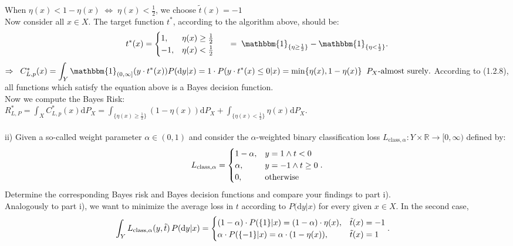 \documentclass{article}
\begin{document}
When $\eta(x) < 1-\eta(x) \;\Leftrightarrow\; \eta(x) < \frac{1}{2}$, we choose $\tilde{t}(x) = -1$\\
Now consider all $x\in X$. The target function $t^*$, according to the algorithm above, should be:
\begin{align*}
t^*(x) = \begin{cases} 1, &\eta(x) \geq \frac{1}{2} \cr -1, &\eta(x) < \frac{1}{2} \end{cases} 
\indent = \; \mathbbm{1}_{\{\eta \geq \frac{1}{2}\}} - \mathbbm{1}_{\{\eta < \frac{1}{2}\}}.
\end{align*}
$\Rightarrow \;\; C^*_{L,p}(x) = \displaystyle{ \int_{Y} \mathbbm{1}_{(0,\infty]}(y\cdot t^*(x)) P(\text{d}y|x)} =  1 \cdot P(y\cdot t^*(x) \leq 0 | x) = \min \{ \eta(x), 1-\eta(x) \}\;\; P_X\text{-almost surely}.$
According to (1.2.8), all functions which satisfy the equation above is a Bayes decision function.\\
Now we compute the Bayes Risk:\\
$R^*_{L,P} =  \displaystyle{ \int_{X} C^*_{L,p}(x) \text{d}P_X = \int_{\{\eta(x)\geq \frac{1}{2}\}}(1-\eta(x)) \text{d}P_X + \int_{\{\eta(x) < \frac{1}{2}\}}\eta(x) \text{d}P_X } $.\\
 \\
ii) Given a so-called weight parameter $\alpha \in (0,1)$ and consider the $\alpha$-weighted binary classification loss $L_{\text{class},\alpha} : Y \times \mathbb{R} \rightarrow [0,\infty)$ defined by:
\begin{align*}
L_{\text{class},\alpha} = \begin{cases} 1-\alpha, & y=1 \land t<0 \cr \alpha, & y=-1 \land t\geq 0 \cr 0, &\text{otherwise} \end{cases} .
\end{align*}
Determine the corresponding Bayes risk and Bayes decision functions and compare your findings to part i).
\vspace{0.5em}\\
Analogously to part i), we want to minimize the average loss in $t$ according to $P($d$y|x)$ for every given $x \in X$. In the second case, 
\begin{align*}
\displaystyle{ \int_{Y} L_{\text{class},\alpha}(y,\tilde{t})\, P(\text{d}y|x) }
 & = \begin{cases} (1-\alpha)\cdot P(\{1\}|x) = (1-\alpha)\cdot \eta(x), &\tilde{t}(x) = -1 \cr  \alpha \cdot P(\{-1\}|x) = \alpha \cdot (1- \eta(x)), &\tilde{t}(x) = 1 \end{cases}.
\end{align*}
\end{document}
